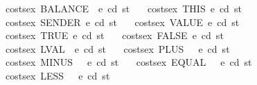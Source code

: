\begin{isabellebody}
{\isacharbar}{\kern0pt}\ {\isachardoublequoteopen}costs{\isacharunderscore}{\kern0pt}ex\ {\isacharparenleft}{\kern0pt}BALANCE\ {\isacharunderscore}{\kern0pt}{\isacharparenright}{\kern0pt}\ e\ cd\ st\ {\isacharequal}{\kern0pt}\ {}{\isachardoublequoteclose}\isanewline
{\isacharbar}{\kern0pt}\ {\isachardoublequoteopen}costs{\isacharunderscore}{\kern0pt}ex\ THIS\ e\ cd\ st\ {\isacharequal}{\kern0pt}\ {}{\isachardoublequoteclose}\isanewline
{\isacharbar}{\kern0pt}\ {\isachardoublequoteopen}costs{\isacharunderscore}{\kern0pt}ex\ SENDER\ e\ cd\ st\ {\isacharequal}{\kern0pt}\ {}{\isachardoublequoteclose}\isanewline
{\isacharbar}{\kern0pt}\ {\isachardoublequoteopen}costs{\isacharunderscore}{\kern0pt}ex\ VALUE\ e\ cd\ st\ {\isacharequal}{\kern0pt}\ {}{\isachardoublequoteclose}\isanewline
{\isacharbar}{\kern0pt}\ {\isachardoublequoteopen}costs{\isacharunderscore}{\kern0pt}ex\ {\isacharparenleft}{\kern0pt}TRUE{\isacharparenright}{\kern0pt}\ e\ cd\ st\ {\isacharequal}{\kern0pt}\ {}{\isachardoublequoteclose}\isanewline
{\isacharbar}{\kern0pt}\ {\isachardoublequoteopen}costs{\isacharunderscore}{\kern0pt}ex\ {\isacharparenleft}{\kern0pt}FALSE{\isacharparenright}{\kern0pt}\ e\ cd\ st\ {\isacharequal}{\kern0pt}\ {}{\isachardoublequoteclose}\isanewline
{\isacharbar}{\kern0pt}\ {\isachardoublequoteopen}costs{\isacharunderscore}{\kern0pt}ex\ {\isacharparenleft}{\kern0pt}LVAL\ {\isacharunderscore}{\kern0pt}{\isacharparenright}{\kern0pt}\ e\ cd\ st\ {\isacharequal}{\kern0pt}\ {}{\isachardoublequoteclose}\isanewline
{\isacharbar}{\kern0pt}\ {\isachardoublequoteopen}costs{\isacharunderscore}{\kern0pt}ex\ {\isacharparenleft}{\kern0pt}PLUS\ {\isacharunderscore}{\kern0pt}\ {\isacharunderscore}{\kern0pt}{\isacharparenright}{\kern0pt}\ e\ cd\ st\ {\isacharequal}{\kern0pt}\ {}{\isachardoublequoteclose}\isanewline
{\isacharbar}{\kern0pt}\ {\isachardoublequoteopen}costs{\isacharunderscore}{\kern0pt}ex\ {\isacharparenleft}{\kern0pt}MINUS\ {\isacharunderscore}{\kern0pt}\ {\isacharunderscore}{\kern0pt}{\isacharparenright}{\kern0pt}\ e\ cd\ st\ {\isacharequal}{\kern0pt}\ {}{\isachardoublequoteclose}\isanewline
{\isacharbar}{\kern0pt}\ {\isachardoublequoteopen}costs{\isacharunderscore}{\kern0pt}ex\ {\isacharparenleft}{\kern0pt}EQUAL\ {\isacharunderscore}{\kern0pt}\ {\isacharunderscore}{\kern0pt}{\isacharparenright}{\kern0pt}\ e\ cd\ st\ {\isacharequal}{\kern0pt}\ {}{\isachardoublequoteclose}\isanewline
{\isacharbar}{\kern0pt}\ {\isachardoublequoteopen}costs{\isacharunderscore}{\kern0pt}ex\ {\isacharparenleft}{\kern0pt}LESS\ {\isacharunderscore}{\kern0pt}\ {\isacharunderscore}{\kern0pt}{\isacharparenright}{\kern0pt}\ e\ cd\ st\ {\isacharequal}{\kern0pt}\ {}{\isachardoublequoteclose}\isanewline

\end{isabellebody}

